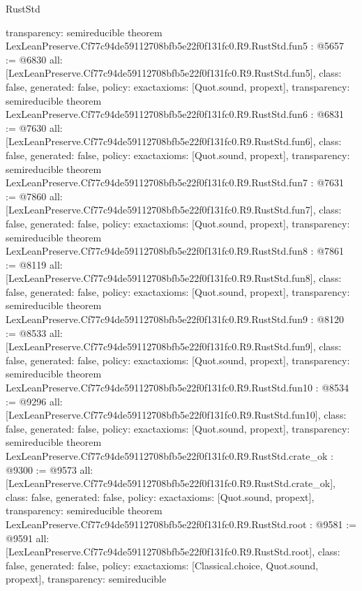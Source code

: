 \begin{lexlean}{RustStd}
\begin{coremodule}
{  transparency: semireducible
}
theorem LexLeanPreserve.Cf77c94de59112708bfb5e22f0f131fc0.R9.RustStd.fun5 : @5657 := @6830 {
  all: [LexLeanPreserve.Cf77c94de59112708bfb5e22f0f131fc0.R9.RustStd.fun5],
  class: false,
  generated: false,
  policy: exact{axioms: [Quot.sound, propext]},
  transparency: semireducible
}
theorem LexLeanPreserve.Cf77c94de59112708bfb5e22f0f131fc0.R9.RustStd.fun6 : @6831 := @7630 {
  all: [LexLeanPreserve.Cf77c94de59112708bfb5e22f0f131fc0.R9.RustStd.fun6],
  class: false,
  generated: false,
  policy: exact{axioms: [Quot.sound, propext]},
  transparency: semireducible
}
theorem LexLeanPreserve.Cf77c94de59112708bfb5e22f0f131fc0.R9.RustStd.fun7 : @7631 := @7860 {
  all: [LexLeanPreserve.Cf77c94de59112708bfb5e22f0f131fc0.R9.RustStd.fun7],
  class: false,
  generated: false,
  policy: exact{axioms: [Quot.sound, propext]},
  transparency: semireducible
}
theorem LexLeanPreserve.Cf77c94de59112708bfb5e22f0f131fc0.R9.RustStd.fun8 : @7861 := @8119 {
  all: [LexLeanPreserve.Cf77c94de59112708bfb5e22f0f131fc0.R9.RustStd.fun8],
  class: false,
  generated: false,
  policy: exact{axioms: [Quot.sound, propext]},
  transparency: semireducible
}
theorem LexLeanPreserve.Cf77c94de59112708bfb5e22f0f131fc0.R9.RustStd.fun9 : @8120 := @8533 {
  all: [LexLeanPreserve.Cf77c94de59112708bfb5e22f0f131fc0.R9.RustStd.fun9],
  class: false,
  generated: false,
  policy: exact{axioms: [Quot.sound, propext]},
  transparency: semireducible
}
theorem LexLeanPreserve.Cf77c94de59112708bfb5e22f0f131fc0.R9.RustStd.fun10 : @8534 := @9296 {
  all: [LexLeanPreserve.Cf77c94de59112708bfb5e22f0f131fc0.R9.RustStd.fun10],
  class: false,
  generated: false,
  policy: exact{axioms: [Quot.sound, propext]},
  transparency: semireducible
}
theorem LexLeanPreserve.Cf77c94de59112708bfb5e22f0f131fc0.R9.RustStd.crate_ok : @9300 := @9573 {
  all: [LexLeanPreserve.Cf77c94de59112708bfb5e22f0f131fc0.R9.RustStd.crate_ok],
  class: false,
  generated: false,
  policy: exact{axioms: [Quot.sound, propext]},
  transparency: semireducible
}
theorem LexLeanPreserve.Cf77c94de59112708bfb5e22f0f131fc0.R9.RustStd.root : @9581 := @9591 {
  all: [LexLeanPreserve.Cf77c94de59112708bfb5e22f0f131fc0.R9.RustStd.root],
  class: false,
  generated: false,
  policy: exact{axioms: [Classical.choice, Quot.sound, propext]},
  transparency: semireducible
}


\end{coremodule}
\end{lexlean}
